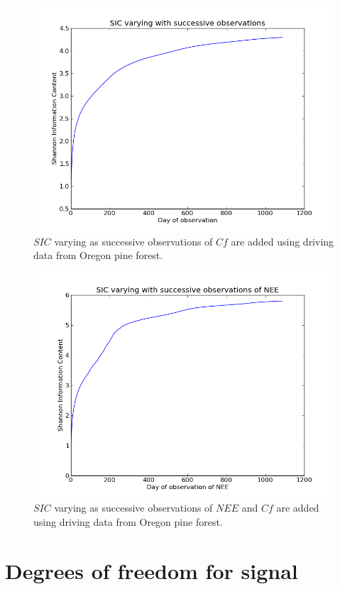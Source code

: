 \documentclass[11pt]{article}
\begin{document}
\begin{figure}[ht]
\centering
\includegraphics[width=1\textwidth]{SIC_0_1090Cf.png}
\caption{$SIC$ varying as successive observations of $Cf$ are added using driving data from Oregon pine forest.}
\label{fig:SIC_subplot}
\end{figure}

\begin{figure}[ht]
\centering
\includegraphics[width=1\textwidth]{SIC_0_1090CfNEE.png}
\caption{$SIC$ varying as successive observations of $NEE$ and $Cf$ are added using driving data from Oregon pine forest.}
\label{fig:SIC_subplot}
\end{figure}

\section*{Degrees of freedom for signal}
\end{document}
